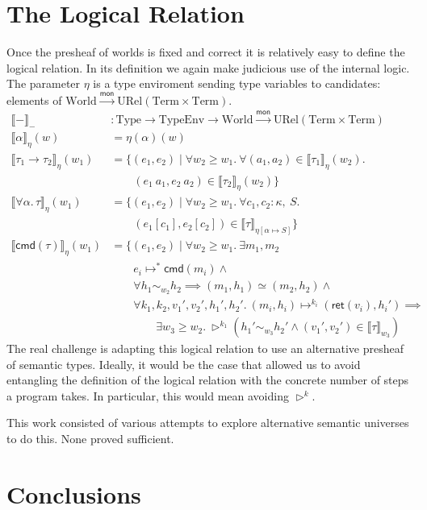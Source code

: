 \documentclass[a0,landscape]{a0poster}
\newcommand{\mto}{\ensuremath{\xrightarrow{\mathsf{mon}}}}
\newcommand{\den}[1]{\ensuremath{\llbracket #1 \rrbracket}}
\newcommand{\worlds}{\ensuremath{\mathrm{World}}}
\newcommand{\types}{\ensuremath{\mathrm{Type}}}
\newcommand{\typesEnv}{\ensuremath{\mathrm{TypeEnv}}}
\newcommand{\term}{\ensuremath{\mathrm{Term}}}
\newcommand{\urel}{\ensuremath{\mathrm{URel}}}
\newcommand{\steps}[2]{\ensuremath{#1 \mapsto^* #2}}
\newcommand{\stepsM}[5][*]{\ensuremath{(#2, #3) \mapsto^{#1} (#4, #5)}}
\newcommand{\ilater}{\ensuremath{{\triangleright}}}
\newcommand{\fn}[2]{\ensuremath{#1 \to #2}}
\newcommand{\cmd}[1]{\ensuremath{\mathsf{cmd}(#1)}}
\newcommand{\ap}[2]{\ensuremath{#1\ #2}}
\newcommand{\allNoKind}[2]{\ensuremath{\forall #1.\, #2}}
\newcommand{\Ap}[2]{\ensuremath{#1[#2]}}
\newcommand{\ret}[1]{\ensuremath{\mathsf{ret}(#1)}}
\begin{document}
\begin{multicols}{4}
  \section*{The Logical Relation}
  Once the presheaf of worlds is fixed and correct it is relatively
  easy to define the logical relation. In its definition we again make
  judicious use of the internal logic. The parameter $\eta$ is a type
  enviroment sending type variables to candidates: elements of
  $\worlds \mto \urel(\term \times \term)$.
  \begin{align*}
    \den{-}_{-} &: \types \to \typesEnv \to \worlds \mto \urel(\term \times \term)\\
    \den{\alpha}_\eta(w) &= \eta(\alpha)(w)\\
    \den{\fn{\tau_1}{\tau_2}}_\eta(w_1) &=
     \{(e_1, e_2) \mid \forall w_2 \ge w_1.\ \forall (a_1, a_2) \in \den{\tau_1}_\eta(w_2).\\
     &\qquad (\ap{e_1}{a_1}, \ap{e_2}{a_2}) \in \den{\tau_2}_\eta(w_2)\}\\
    \den{\allNoKind{\alpha}{\tau}}_\eta(w_1) &=
     \{(e_1, e_2) \mid \forall w_2 \ge w_1.\ \forall c_1, c_2 : \kappa,\ S.\\
     &\qquad (\Ap{e_1}{c_1}, \Ap{e_2}{c_2}) \in \den{\tau}_{\eta[\alpha \mapsto S]}\}\\
    \den{\cmd{\tau}}_\eta(w_1) &= \{(e_1, e_2) \mid \forall w_2 \ge w_1.\ \exists m_1, m_2\\
    & \qquad \steps{e_i}{\cmd{m_i}} \land{} \\
    & \qquad \forall h_1 \sim_{w_2} h_2 \implies (m_1, h_1) \simeq (m_2, h_2) \land {}\\
    & \qquad \forall k_1, k_2, v_1', v_2', h_1', h_2'.\ \stepsM[k_i]{m_i}{h_i}{\ret{v_i}}{h_i'} \implies\\
    & \qquad\qquad \exists w_3 \ge w_2.\ \ilater^{k_1} (h_1' \sim_{w_3} h_2' \land (v_1', v_2') \in \den{\tau}_{w_3})
  \end{align*}
  The real challenge is adapting this logical relation to use an
  alternative presheaf of semantic types. Ideally, it would be the
  case that allowed us to avoid entangling the definition of the
  logical relation with the concrete number of steps a program
  takes. In particular, this would mean avoiding $\ilater^k$.

  This work consisted of various attempts to explore alternative
  semantic universes to do this. None proved sufficient.

  \color{SaddleBrown}
  \section*{Conclusions}


\end{multicols}
\end{document}
